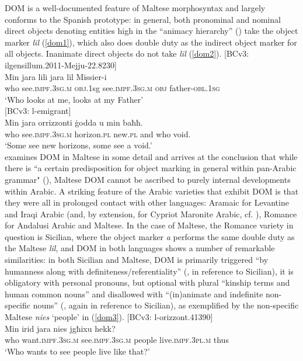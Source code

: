 \documentclass[output=paper]{langsci/langscibook}
\begin{document}
DOM is a well-documented feature of Maltese morphosyntax and largely conforms to the Spanish prototype: in general, both pronominal and nominal direct objects denoting entities high in the ``animacy hierarchy'' (\citealt[55]{BorgAzzopardi-Alexander1997}) take the object marker \textit{lil} (\ref{dom1}), which also does double duty as the indirect object marker for all objects. Inanimate direct objects do not take \textit{lil} (\ref{dom2}).
\ea\label{dom1} 
{[BCv3: ilgensillum.2011-Mejju-22.8230]}\\
\gll Min jara lili jara lil Missier-i\\
	who see.\textsc{impf.3sg.m} \textsc{obj}.1sg see.\textsc{impf.3sg.m} \textsc{obj} father-\textsc{obl.1sg}\\
	\glt `Who looks at me, looks at my Father'\\
\z
\ea\label{dom2}
{[BCv3: l-emigrant]}\\
\gll Min jara orrizzonti ġodda u min baħħ.\\
	who see.\textsc{impf.3sg.m} horizon.\textsc{pl} new.\textsc{pl} and who void.\\
	\glt `Some see new horizons, some see a void.'\\
\z
 \cite{dohla2016} examines DOM in Maltese in some detail and arrives at the conclusion that while there is ``a certain predisposition for object marking in general within pan-Arabic grammar" (\citeyear[169]{dohla2016}), Maltese DOM cannot be ascribed to purely internal developments within Arabic. A striking feature of the Arabic varieties that exhibit DOM is that they were all in prolonged contact with other languages: Aramaic for Levantine and Iraqi Arabic (and, by extension, for Cypriot Maronite Arabic, cf. \citealt[412]{Borg2004}), Romance for Andalusi Arabic and Maltese. In the case of Maltese, the Romance variety in question is Sicilian, where the object marker \textit{a} performs the same double duty as the Maltese \textit{lil}, and DOM in both languages shows a number of remarkable similarities: in both Sicilian and Maltese, DOM is primarily triggered ``by humanness along with definiteness/referentiality'' (\citealt[257]{iemmolo2010}, in reference to Sicilian), it is obligatory with personal pronouns, but optional with plural ``kinship terms and human common nouns'' and disallowed with ``(in)animate and indefinite non-specific nouns'' (\citealt[257]{iemmolo2010}, again in reference to Sicilian), as exemplified by the non-specific Maltese \textit{nies} `people' in (\ref{dom3}).
\ea\label{dom3} 
{[BCv3: l-orizzont.41390]}\\
\gll Min irid jara nies jgħixu hekk?\\
	who want.\textsc{impf.3sg.m} see.\textsc{impf.3sg.m} people live.\textsc{impf.3pl.m} thus\\
	\glt `Who wants to see people live like that?'\\
\z
\end{document}
